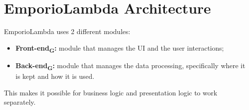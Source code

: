 \section{EmporioLambda Architecture}
EmporioLambda uses 2 different modules:
\begin{itemize}
\item \textbf{Front-end\textsubscript{G}:} module that manages the UI and the user interactions;
\item \textbf{Back-end\textsubscript{G}:} module that manages the data processing, specifically where it is kept and how it is used.
\end{itemize}
This makes it possible for business logic and presentation logic to work separately.


\newpage

\newpage

\newpage

\newpage

\newpage



\newpage